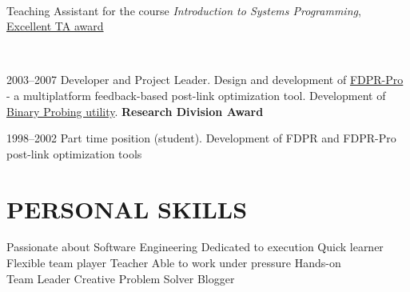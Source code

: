 \documentclass[]{deedy-resume}
\begin{document}
\begin{minipage}[t]{0.66\textwidth}
 \\
\vspace{\topsep} %
Teaching Assistant for the course \textit{Introduction to Systems Programming}, \href{http://www.cs.technion.ac.il/news/2010/384/}{Excellent TA award}
\sectionsep

 \\
\vspace{\topsep} %
\begin{tightemize}
\item 2003--2007 Developer and Project Leader. Design and development of \href{http://www.haifa.il.ibm.com/projects/systems/cot/fdpr/}{FDPR-Pro} - a multiplatform feedback-based post-link optimization tool. Development of \href{https://www.research.ibm.com/haifa/projects/systems/cot/bprober/index.html}{Binary Probing utility}. \textbf{Research Division Award}
\item  1998--2002 Part time position (student). Development of FDPR and FDPR-Pro post-link optimization tools
\end{tightemize}
\sectionsep


\section{PERSONAL SKILLS}
Passionate about Software Engineering \textbullet{} Dedicated to execution \textbullet{}  Quick learner\\
Flexible team player \textbullet{} Teacher \textbullet{}  Able to work under pressure \textbullet{} Hands-on \\
Team Leader \textbullet{} Creative Problem Solver \textbullet{} Blogger


\end{minipage}
\end{document}
